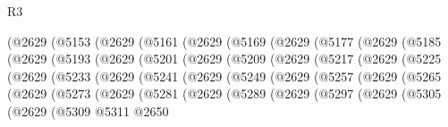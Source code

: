 \begin{lexlean}{R3}
\begin{coremodule}
          (@2629
            (@5153
              (@2629
                (@5161
                  (@2629
                    (@5169
                      (@2629
                        (@5177
                          (@2629
                            (@5185
                              (@2629
                                (@5193
                                  (@2629
                                    (@5201
                                      (@2629
                                        (@5209
                                          (@2629
                                            (@5217
                                              (@2629
                                                (@5225
                                                  (@2629
                                                    (@5233
                                                      (@2629
                                                        (@5241
                                                          (@2629
                                                            (@5249
                                                              (@2629
                                                                (@5257
                                                                  (@2629
                                                                    (@5265
                                                                      (@2629
                                                                        (@5273
                                                                          (@2629
                                                                            (@5281
                                                                              (@2629
                                                                                (@5289
                                                                                  (@2629
                                                                                    (@5297
                                                                                      (@2629
                                                                                        (@5305
                                                                                          (@2629
                                                                                            (@5309
                                                                                              @5311
                                                                                              @2650

\end{coremodule}
\end{lexlean}
